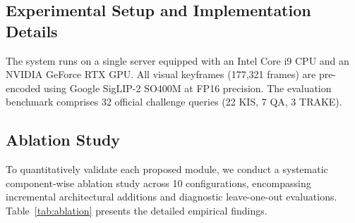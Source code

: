 \documentclass[runningheads]{llncs}
\begin{document}
\subsection{Experimental Setup and Implementation Details}
The system runs on a single server equipped with an Intel Core i9 CPU and an NVIDIA GeForce RTX GPU. All visual keyframes (177,321 frames) are pre-encoded using Google SigLIP-2 SO400M at FP16 precision. The evaluation benchmark comprises 32 official challenge queries (22 KIS, 7 QA, 3 TRAKE).

\subsection{Ablation Study}
To quantitatively validate each proposed module, we conduct a systematic component-wise ablation study across 10 configurations, encompassing incremental architectural additions and diagnostic leave-one-out evaluations. Table~\ref{tab:ablation} presents the detailed empirical findings.
\end{document}
